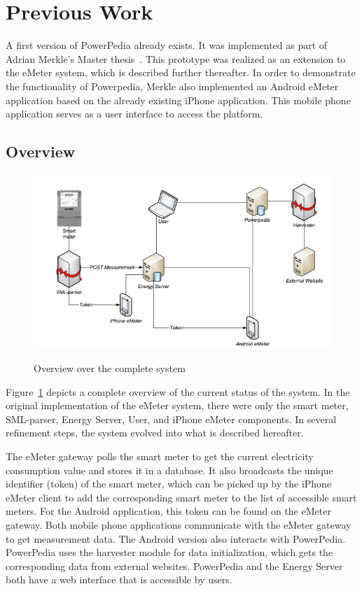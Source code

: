 \section{Previous Work} \label{sec:previous_work}
A first version of PowerPedia already exists. It was implemented as part of Adrian Merkle's Master thesis~\cite{merklepp}. This prototype was realized as an extension to the eMeter system, which is described further thereafter.
In order to demonstrate the functionality of Powerpedia, Merkle also implemented an Android eMeter application based on the already existing iPhone application. This mobile phone application serves as a user interface to access the platform.

\subsection{Overview}
\begin{center}
\begin{figure}
 \includegraphics[width=15cm]{Images/emeter_overview.png}
 \label{emeter_overview}
 \caption{Overview over the complete system}
\end{figure}
\end{center}
Figure~\ref{emeter_overview} depicts a complete overview of the current status of the system. In the original implementation of the eMeter system, there were only the smart meter, SML-parser, Energy Server, User, and iPhone eMeter components. In several refinement steps, the system evolved into what is described hereafter. 

The eMeter gateway polls the smart meter to get the current electricity consumption value and stores it in a database. It also broadcasts the unique identifier (token) of the smart meter, which can be picked up by the iPhone eMeter client to add the corresponding smart meter to the list of accessible smart meters. For the Android application, this token can be found on the eMeter gateway. Both mobile phone applications communicate with the eMeter gateway to get measurement data. The Android version also interacts with PowerPedia. PowerPedia uses the harvester module for data initialization, which gets the corresponding data from external websites. 
PowerPedia and the Energy Server both have a web interface that is accessible by users.  

